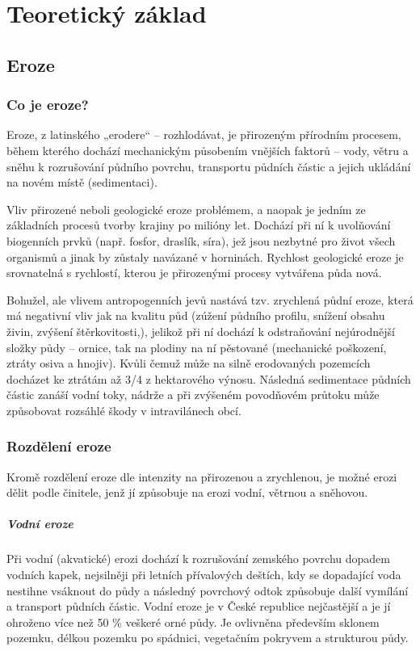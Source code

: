 \chapter{Teoretický základ}
\label{2-teorie}
\section{Eroze}
\subsection{Co je eroze?}
Eroze, z latinského „erodere“ – rozhlodávat, je přirozeným přírodním procesem, během kterého dochází mechanickým působením vnějších faktorů – vody, větru a sněhu k rozrušování půdního povrchu, transportu půdních částic a jejich ukládání na novém místě (sedimentaci).

Vliv přirozené neboli geologické eroze problémem, a naopak je jedním ze základních procesů tvorby krajiny po milióny let. Dochází při ní k uvolňování biogenních prvků (např. fosfor, draslík, síra), jež jsou nezbytné pro život všech organismů a jinak by zůstaly navázané v horninách. Rychlost geologické eroze je srovnatelná s rychlostí, kterou je přirozenými procesy vytvářena půda nová.

Bohužel, ale vlivem antropogenních jevů nastává tzv. zrychlená půdní eroze, která má negativní vliv jak na kvalitu půd (zúžení půdního profilu, snížení obsahu živin, zvýšení štěrkovitosti,), jelikož při ní dochází k odstraňování nejúrodnější složky půdy – ornice, tak na plodiny na ní pěstované (mechanické poškození, ztráty osiva a hnojiv). Kvůli čemuž může na silně erodovaných pozemcích docházet ke ztrátám až 3/4 z hektarového výnosu. Následná sedimentace půdních částic zanáší vodní toky, nádrže a při zvýšeném povodňovém průtoku může způsobovat rozsáhlé škody v intravilánech obcí.
\subsection{Rozdělení eroze}
Kromě rozdělení eroze dle intenzity na přirozenou a zrychlenou, je možné erozi dělit podle činitele, jenž jí způsobuje na erozi vodní, větrnou a sněhovou.
\paragraph{Vodní eroze}
Při vodní (akvatické) erozi dochází k rozrušování zemského povrchu dopadem vodních kapek, nejsilněji při letních přívalových deštích, kdy se dopadající voda nestihne vsáknout do půdy a následný povrchový odtok způsobuje další vymílání a transport půdních částic. Vodní eroze je v České republice nejčastější a je jí ohroženo více než 50 \% veškeré orné půdy. Je ovlivněna především sklonem pozemku, délkou pozemku po spádnici, vegetačním pokryvem a strukturou půdy.

